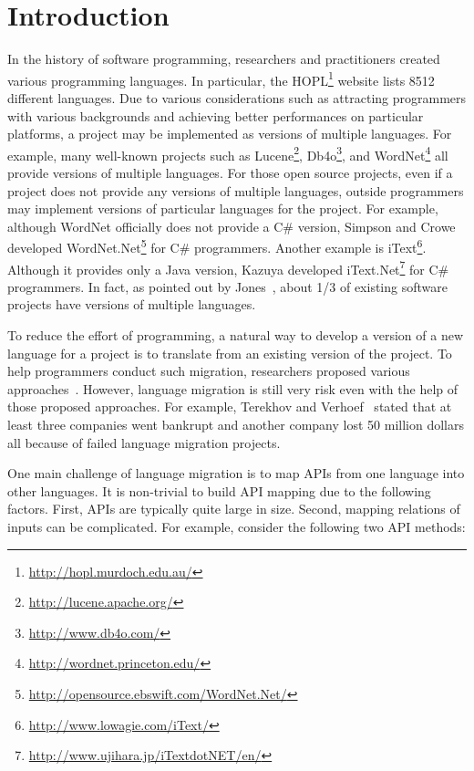 \section{Introduction}
\label{sec:introduction} In the history of software programming,
researchers and practitioners created various programming languages.
In particular, the HOPL\footnote{\url{http://hopl.murdoch.edu.au/}}
website lists 8512 different languages. Due to various
considerations such as attracting programmers with various
backgrounds and achieving better performances on particular
platforms, a project may be implemented as versions of multiple
languages. For example, many well-known projects such as
Lucene\footnote{\url{http://lucene.apache.org/}},
Db4o\footnote{\url{http://www.db4o.com/}}, and
WordNet\footnote{\url{http://wordnet.princeton.edu/}} all provide
versions of multiple languages. For those open source projects, even
if a project does not provide any versions of multiple languages,
outside programmers may implement versions of particular languages
for the project. For example, although WordNet officially does not
provide a C\# version, Simpson and Crowe developed
WordNet.Net\footnote{\url{http://opensource.ebswift.com/WordNet.Net/}}
for C\# programmers. Another example is
iText\footnote{\url{http://www.lowagie.com/iText/}}. Although it
provides only a Java version, Kazuya developed
iText.Net\footnote{\url{http://www.ujihara.jp/iTextdotNET/en/}} for
C\# programmers. In fact, as pointed out by
Jones~\cite{jones1998estimating}, about 1/3 of existing software
projects have versions of multiple languages.

To reduce the effort of programming, a natural way to develop a
version of a new language for a project is to translate from an
existing version of the project. To help programmers conduct such
migration, researchers proposed various
approaches~\cite{mossienko2003automated,yasumatsu1995spice,hainaut2008migration}.
However, language migration is still very risk even with the help of
those proposed approaches. For example, Terekhov and
Verhoef~\cite{terekhov2000realities} stated that at least three
companies went bankrupt and another company lost 50 million dollars
all because of failed language migration projects.

One main challenge of language migration is to map APIs from one
language into other languages. It is non-trivial to build API
mapping due to the following factors. First, APIs are typically
quite large in size. Second, mapping relations of inputs can be
complicated. For example, consider the following two API methods:

